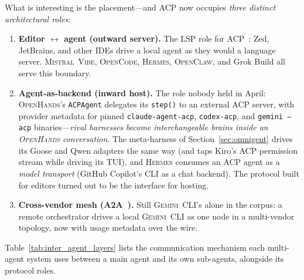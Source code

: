 \documentclass[11pt,a4paper]{article}
\newcommand{\oh}{\textsc{OpenHands}\xspace}
\newcommand{\ocl}{\textsc{OpenClaw}\xspace}
\newcommand{\vibe}{\textsc{Mistral~Vibe}\xspace}
\newcommand{\gemini}{\textsc{Gemini~CLI}\xspace}
\newcommand{\hrm}{\textsc{Hermes}\xspace}
\newcommand{\ocd}{\textsc{OpenCode}\xspace}
\begin{document}
What is interesting is the placement---and ACP now occupies \emph{three distinct architectural roles}:

\begin{enumerate}[itemsep=2pt]
  \item \textbf{Editor $\leftrightarrow$ agent (outward server).} The LSP role for ACP~\cite{acp2025}: Zed, JetBrains, and other IDEs drive a local agent as they would a language server. \vibe{}, \ocd{}, \hrm{}, \ocl{}, and Grok Build all serve this boundary.
  \item \textbf{Agent-as-backend (inward host).} The role nobody held in April: \oh{}'s \texttt{ACPAgent} delegates its \texttt{step()} to an external ACP server, with provider metadata for pinned \texttt{claude-agent-acp}, \texttt{codex-acp}, and \texttt{gemini --acp} binaries---\emph{rival harnesses become interchangeable brains inside an \oh{} conversation}. The meta-harness of Section~\ref{sec:omnigent} drives its Goose and Qwen adapters the same way (and taps Kiro's ACP permission stream while driving its TUI), and \hrm{} consumes an ACP agent as a \emph{model transport} (GitHub Copilot's CLI as a chat backend). The protocol built for editors turned out to be the interface for hosting.
  \item \textbf{Cross-vendor mesh (A2A~\cite{a2a2025}).} Still \gemini{}'s alone in the corpus: a remote orchestrator drives a local \gemini{} as one node in a multi-vendor topology, now with usage metadata over the wire.
\end{enumerate}

Table~\ref{tab:inter_agent_layers} lists the communication mechanism each multi-agent system uses between a main agent and its own sub-agents, alongside its protocol roles.
\end{document}
